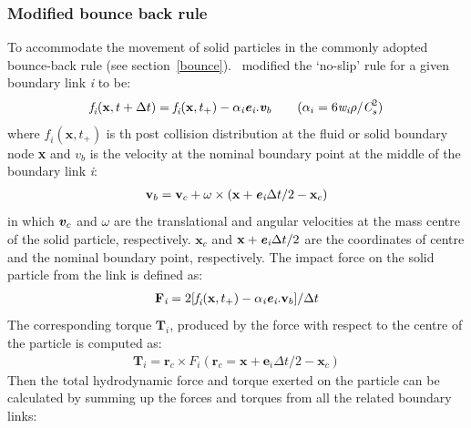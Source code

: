 
\subsubsection*{Modified bounce back rule}
To accommodate the movement of solid particles in the commonly adopted bounce-back rule (see section~\ref{bounce}).~\citet{Ladd1994} modified the `no-slip' rule for a given boundary link \textit{i} to be:
\begin{align}
\textit{f}_{\textit{i}}(\textbf{x}, t + \Delta t)=\textit{f}_{\textit{i}}(\textbf{x}, t_{+}) - \alpha_{\textit{i}}\textbf{\textit{e}}_{\textit{i}}.\textbf{\textit{v}}_{b} \qquad (\alpha_{i}=6\textit{w}_{\textit{i}}\rho/\textit{C}_{\textit{s}}^{2})
\end{align}
where $\textit{f}_{\textit{i}}(\textbf{x}, t_{+})$ is th post collision distribution at the fluid or solid boundary node \textbf{x} and $\textit{v}_{b}$ is the velocity at the nominal boundary point at the middle of the boundary link \textit{i}:
\begin{align}
\textbf{v}_{b}=\textbf{v}_{c}+\omega \times (\textbf{x}+\textbf{\textit{e}}_{\textit{i}}\Delta t /2 - \textbf{x}_{c})
\end{align}
in which $\textbf{\textit{v}}_{c}$ and $\omega$ are the translational and angular velocities at the mass centre of the solid particle, respectively. $\textbf{x}_{c}$ and $\textbf{x}+\textbf{\textit{e}}_{\textit{i}}\Delta t /2$ are the coordinates of centre and the nominal boundary point,  respectively. The impact force on the solid particle from the link is defined as:
\begin{align}
\textbf{F}_{\textit{i}}=2[\textit{f}_{\textit{i}} (\textbf{x}, t_{+}) -\alpha_{\textit{i}}\textbf{\textit{e}}_{\textit{i}}.\textbf{v}_{b}]/ \Delta t
\end{align} 
The corresponding torque $\textbf{T}_{\textit{i}}$, produced by the force with respect to the centre of the particle is computed as:
\begin{align}
\textbf{T}_{\textit{i}}=\textbf{r}_{c} \times \textit{F}_{\textit{i}} (\textbf{r}_{c}=\textbf{x}+\textbf{e}_{\textit{i}} \Delta t /2 - \textbf{x}_{c})
\end{align}
Then the total hydrodynamic force and torque exerted on the particle can be calculated by summing up the forces and torques from all the related boundary links:
